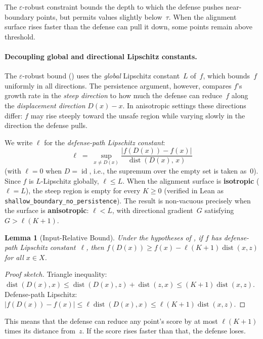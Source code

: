 \documentclass[11pt]{article}
\newtheorem{lemma}[theorem]{Lemma}
\newcommand{\id}{\operatorname{id}}
\newcommand{\dist}{\operatorname{dist}}
\begin{document}
The $\varepsilon$-robust constraint bounds the depth to which the
defense pushes near-boundary points, but permits values slightly
below~$\tau$. When the alignment surface rises faster than the
defense can pull it down, some points remain above threshold.

\paragraph{Decoupling global and directional Lipschitz constants.}
The $\varepsilon$-robust bound () uses the
\emph{global} Lipschitz constant~$L$ of~$f$, which bounds~$f$
uniformly in all directions. The persistence argument, however,
compares $f$'s growth rate in the \emph{steep direction} to how much
the defense can reduce~$f$ along the \emph{displacement direction}
$D(x) - x$. In anisotropic settings these directions differ: $f$ may
rise steeply toward the unsafe region while varying slowly in the
direction the defense pulls.

We write $\ell$ for the \emph{defense-path Lipschitz constant}:
\[
  \ell \;=\; \sup_{x \neq D(x)}
    \frac{|f(D(x)) - f(x)|}{\dist(D(x),\, x)}
\]
(with $\ell = 0$ when $D = \id$, i.e., the supremum over the empty
set is taken as~$0$).
Since $f$ is $L$-Lipschitz globally, $\ell \leq L$. When the
alignment surface is \textbf{isotropic} ($\ell = L$), the steep region
is empty for every $K \geq 0$ (verified in Lean as
\texttt{shallow\_boundary\_no\_persistence}). The result is
non-vacuous precisely when the surface is \textbf{anisotropic}:
$\ell < L$, with directional gradient~$G$ satisfying
$G > \ell(K+1)$.

\begin{lemma}[Input-Relative Bound]
\label{lem:input-bound}
Under the hypotheses of , if $f$ has
defense-path Lipschitz constant~$\ell$, then
$f(D(x)) \geq f(x) - \ell(K+1)\dist(x,z)$
for all $x \in X$.
\end{lemma}

\begin{proof}[Proof sketch]
Triangle inequality:
$\dist(D(x), x) \leq \dist(D(x), z) + \dist(z, x)
\leq (K+1)\dist(x, z)$.
Defense-path Lipschitz: $|f(D(x)) - f(x)| \leq \ell\dist(D(x), x)
\leq \ell(K+1)\dist(x, z)$.
\end{proof}

This means that the defense can reduce any point's score by at most
$\ell(K+1)$ times its distance from~$z$. If the score rises faster
than that, the defense loses.
\end{document}
